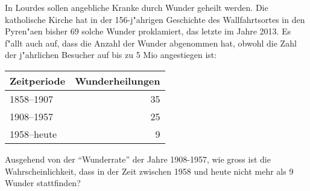 In Lourdes sollen angebliche Kranke durch Wunder geheilt werden.
Die katholische Kirche hat in der 156-j"ahrigen Geschichte des Wallfahrtsortes
in den Pyren"aen bisher 69 solche Wunder proklamiert, das letzte im Jahre 2013.
Es f"allt auch auf, dass die Anzahl der Wunder abgenommen hat, obwohl
die Zahl der j"ahrlichen Besucher auf bis zu 5 Mio angestiegen ist:
\begin{center}
\begin{tabular}{|l|r|}
\hline
Zeitperiode&Wunderheilungen\\
\hline
1858--1907 &35\\
1908--1957 &25\\
1958--heute& 9\\
\hline
\end{tabular}
\end{center}
Ausgehend von der ``Wunderrate'' der Jahre 1908-1957, wie gross ist die
Wahrscheinlichkeit, dass in der Zeit zwischen 1958 und heute nicht mehr
als 9 Wunder stattfinden?

